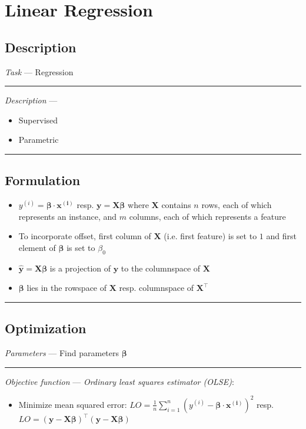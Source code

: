 \section{Linear Regression}
\subsection*{Description}
\emph{Task} --- Regression

{\color{lightgray}\hrule height 0.001mm}

\emph{Description} --- 
\begin{itemize}
    \item Supervised 
    \item Parametric
\end{itemize}

{\color{black}\hrule height 0.001mm}

\subsection*{Formulation}

\begin{itemize}
    \item $y^{(i)} = \boldsymbol{\beta} \cdot \boldsymbol{x^{(i)}}$ resp. $\boldsymbol{y} = \boldsymbol{X}\boldsymbol{\beta}$ where $\boldsymbol{X}$ contains $n$ rows, each of which represents an instance, and $m$ columns, each of which represents a feature
    \item To incorporate offset, first column of $\boldsymbol{X}$ (i.e. first feature) is set to $1$ and first element of $\boldsymbol{\beta}$ is set to $\beta_0$
    \item $\hat{\boldsymbol{y}} = \boldsymbol{X}\boldsymbol{\beta}$ is a projection of $\boldsymbol{y}$ to the columnspace of $\boldsymbol{X}$
    \item $\boldsymbol{\beta}$ lies in the rowspace of $\boldsymbol{X}$ resp. columnspace of $\boldsymbol{X}^\intercal$
\end{itemize}

{\color{black}\hrule height 0.001mm}

\subsection*{Optimization}
\emph{Parameters} --- Find parameters $\boldsymbol{\beta}$

{\color{lightgray}\hrule height 0.001mm}

\emph{Objective function} --- 
\emph{Ordinary least squares estimator (OLSE)}:
\begin{itemize}
    \item Minimize mean squared error: $LO = \frac{1}{n} \sum_{i=1}^n ( y^{(i)} - \boldsymbol{\beta} \cdot \boldsymbol{x^{(i)}} )^2$ resp. $LO = ( \boldsymbol{y} - \boldsymbol{X}\boldsymbol{\beta})^\intercal( \boldsymbol{y} - \boldsymbol{X}\boldsymbol{\beta} )$
\end{itemize}

